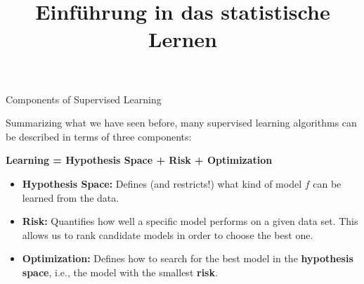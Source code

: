\documentclass[11pt,compress,t,notes=noshow, xcolor=table]{beamer}
\title{Einführung in das statistische Lernen}
\institute{\href{https://compstat-lmu.github.io/lecture_i2ml/}{compstat-lmu.github.io/lecture\_i2ml}}
\date{}
\begin{document}









\begin{vbframe}{Components of Supervised Learning}

Summarizing what we have seen before, many supervised learning algorithms
can be described in terms of three components:

\lz

\begin{center}

  \textbf{Learning = Hypothesis Space + Risk + Optimization}

\end{center}

\lz

\begin{itemize}

  \item \textbf{Hypothesis Space:} Defines (and restricts!) what kind of model
  $f$ can be learned from the data.

  \item \textbf{Risk:} Quantifies how well a specific model performs on a given
  data set. This allows us to rank candidate models in order to choose the best one.

  \item \textbf{Optimization:} Defines how to search for the best model in the
  \textbf{hypothesis space}, i.e., the model with the smallest \textbf{risk}.

\end{itemize}

\end{vbframe}

\end{document}
